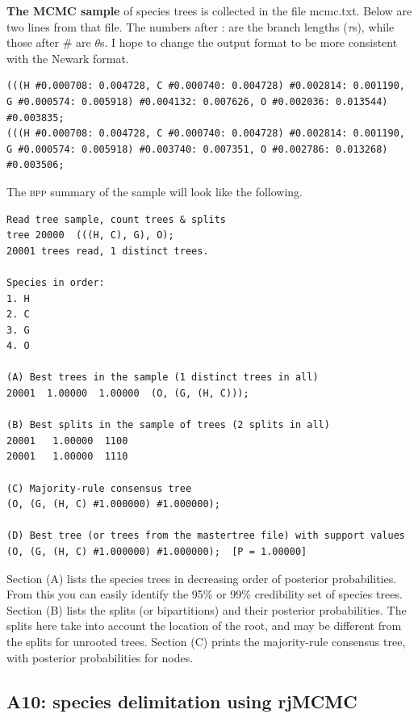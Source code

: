 \documentclass{book}
\numberwithin{equation}{section} \renewcommand{\baselinestretch}{0.55}
\begin{document}
\textbf{The MCMC sample} of species trees is collected in the file
mcmc.txt.  Below are two lines from that file.  The numbers after :
are the branch lengths ($\tau$s), while those after \# are $\theta$s.
I hope to change the output format to be more consistent with the
Newark format.

\begin{verbatim}
(((H #0.000708: 0.004728, C #0.000740: 0.004728) #0.002814: 0.001190, G #0.000574: 0.005918) #0.004132: 0.007626, O #0.002036: 0.013544) #0.003835;
(((H #0.000708: 0.004728, C #0.000740: 0.004728) #0.002814: 0.001190, G #0.000574: 0.005918) #0.003740: 0.007351, O #0.002786: 0.013268) #0.003506;
\end{verbatim}

The \textsc{bpp} summary of the sample will look like the following.
\begin{verbatim}
Read tree sample, count trees & splits
tree 20000  (((H, C), G), O);
20001 trees read, 1 distinct trees.

Species in order:
1. H
2. C
3. G
4. O

(A) Best trees in the sample (1 distinct trees in all)
20001  1.00000  1.00000  (O, (G, (H, C)));

(B) Best splits in the sample of trees (2 splits in all)
20001   1.00000  1100
20001   1.00000  1110

(C) Majority-rule consensus tree
(O, (G, (H, C) #1.000000) #1.000000);

(D) Best tree (or trees from the mastertree file) with support values
(O, (G, (H, C) #1.000000) #1.000000);  [P = 1.00000]
\end{verbatim}

Section (A) lists the species trees in decreasing order of posterior
probabilities.  From this you can easily identify the 95\% or 99\%
credibility set of species trees.  Section (B) lists the splits (or
bipartitions) and their posterior probabilities.  The splits here take
into account the location of the root, and may be different from the
splits for unrooted trees.  Section (C) prints the majority-rule
consensus tree, with posterior probabilities for nodes.


\subsection{A10: species delimitation using rjMCMC}
\end{document}

